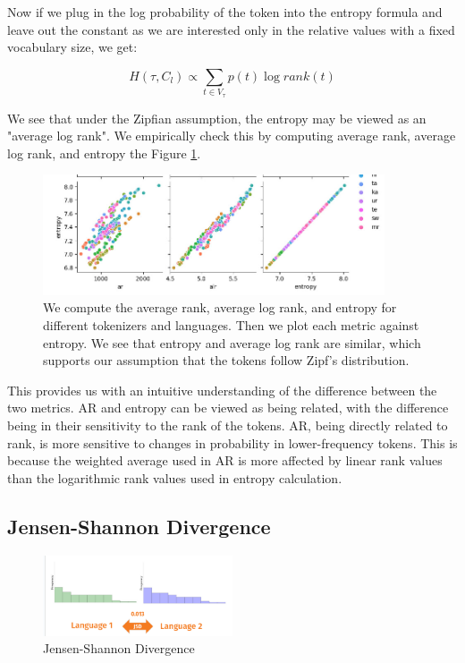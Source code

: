 Now if we plug in the log probability of the token into the entropy formula and leave out the constant as we are interested only in the relative values with a fixed vocabulary size, we get:

\begin{equation}
    H(\tau, C_l) \propto \sum_{t \in V_\tau} p(t) \log rank(t)
\end{equation}

We see that under the Zipfian assumption, the entropy may be viewed as an "average log rank". We empirically check this by computing average rank, average log rank, and entropy the Figure \ref{fig:ar_alr_entropy}.

\begin{figure}
    \centering
    \includegraphics[width=0.9\textwidth]{img/temp/ar_alr_entropy.jpg}
    \caption{We compute the average rank, average log rank, and entropy for different tokenizers and languages. Then we plot each metric against entropy. We see that entropy and average log rank are similar, which supports our assumption that the tokens follow Zipf's distribution.}
    \label{fig:ar_alr_entropy}
\end{figure}

This provides us with an intuitive understanding of the difference between the two metrics. AR and entropy can be viewed as being related, with the difference being in their sensitivity to the rank of the tokens. AR, being directly related to rank, is more sensitive to changes in probability in lower-frequency tokens. This is because the weighted average used in AR is more affected by linear rank values than the logarithmic rank values used in entropy calculation.

\subsection{Jensen-Shannon Divergence}

\begin{figure}[h]
    \centering
    \includegraphics[width=0.5\textwidth]{img/temp/jsd_example.png}
    \caption{Jensen-Shannon Divergence}
    \label{fig:jsd_example}
\end{figure}

